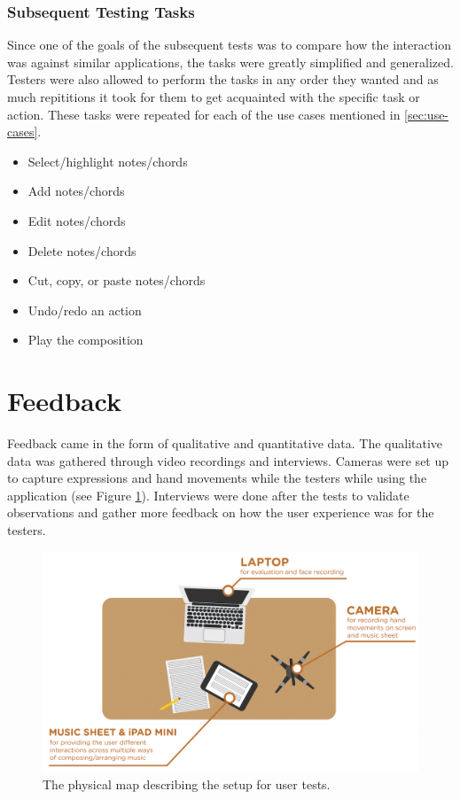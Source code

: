 			\subsubsection{Subsequent Testing Tasks}
			\label{sec:subsequent-tasks}

				Since one of the goals of the subsequent tests was to compare how the interaction was against similar applications, the tasks were greatly simplified and generalized. Testers were also allowed to perform the tasks in any order they wanted and as much repititions it took for them to get acquainted with the specific task or action. These tasks were repeated for each of the use cases mentioned in \ref{sec:use-cases}.

				\begin{itemize}
					\item Select/highlight notes/chords
				  	\item Add notes/chords
				  	\item Edit notes/chords
				  	\item Delete notes/chords
				  	\item Cut, copy, or paste notes/chords
				  	\item Undo/redo an action
				  	\item Play the composition
				\end{itemize}


	\section{Feedback}

		Feedback came in the form of qualitative and quantitative data. The qualitative data was gathered through video recordings and interviews. Cameras were set up to capture expressions and hand movements while the testers while using the application (see Figure \ref{fig:test_setup}). Interviews were done after the tests to validate observations and gather more feedback on how the user experience was for the testers. 

		\begin{figure}[H]
			\centering
			\includegraphics[scale=0.23]{figures/test_setup.png}
		    \caption{The physical map describing the setup for user tests.}
		    \label{fig:test_setup}
		\end{figure} 

